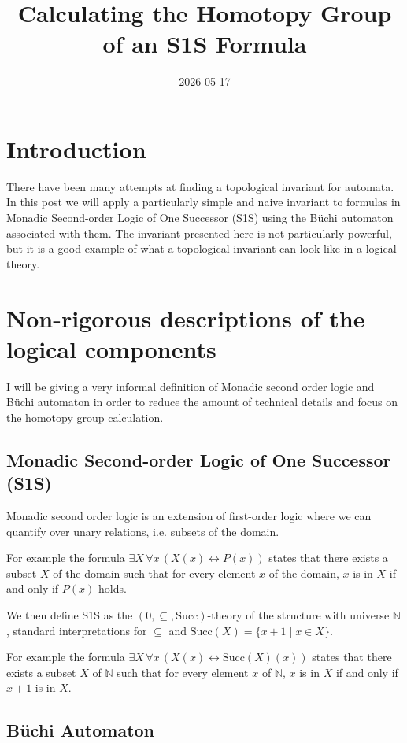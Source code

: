 \documentclass[11pt]{article}
\title{Calculating the Homotopy Group of an S1S Formula}
\author{}
\date{2026-05-17}
\theoremstyle{definition}
\theoremstyle{remark}
\begin{document}
\maketitle

\section{Introduction}

There have been many attempts at finding a topological invariant for automata. In this post we will apply a particularly simple and naive invariant to formulas in Monadic Second-order Logic of One Successor (S1S) using the Büchi automaton associated with them. The invariant presented here is not particularly powerful, but it is a good example of what a topological invariant can look like in a logical theory.

\section{Non-rigorous descriptions of the logical components}

I will be giving a very informal definition of Monadic second order logic and Büchi automaton in order to reduce the amount of technical details and focus on the homotopy group calculation.

\subsection{Monadic Second-order Logic of One Successor (S1S)}

Monadic second order logic is an extension of first-order logic where we can quantify over unary relations, i.e. subsets of the domain.

For example the formula $\exists X \, \forall x\,(X(x) \leftrightarrow P(x))$ states that there exists a subset $X$ of the domain such that for every element $x$ of the domain, $x$ is in $X$ if and only if $P(x)$ holds.

We then define S1S as the $(0,\subseteq,\text{Succ})$-theory of the structure with universe $\mathbb{N}$, standard interpretations for $\subseteq$ and $\text{Succ}(X)=\{ x+1 \mid x \in X \}$.

For example the formula $\exists X \, \forall x\,(X(x) \leftrightarrow \text{Succ}(X)(x))$ states that there exists a subset $X$ of $\mathbb{N}$ such that for every element $x$ of $\mathbb{N}$, $x$ is in $X$ if and only if $x+1$ is in $X$.

\subsection{Büchi Automaton}
\end{document}
